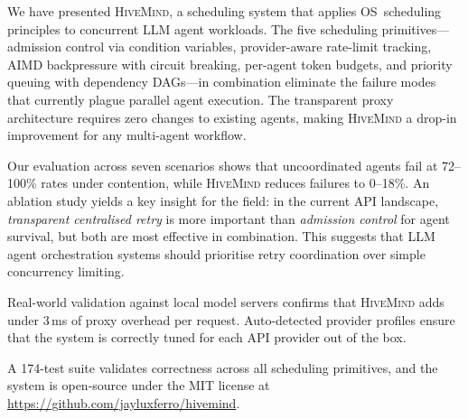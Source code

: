 \documentclass[11pt,twocolumn]{article}
\newcommand{\hm}{\textsc{HiveMind}}
\begin{document}
We have presented \hm{}, a scheduling system that applies
OS~scheduling principles to concurrent LLM agent workloads.
The five scheduling primitives---admission control via condition
variables, provider-aware rate-limit tracking, AIMD backpressure
with circuit breaking, per-agent token budgets, and priority
queuing with dependency DAGs---in combination eliminate the
failure modes that currently plague parallel agent execution.
The transparent proxy architecture requires zero changes to
existing agents, making \hm{} a drop-in improvement for any
multi-agent workflow.

Our evaluation across seven scenarios shows that uncoordinated
agents fail at 72--100\% rates under contention, while \hm{}
reduces failures to 0--18\%.  An ablation study yields a key
insight for the field: in the current API landscape,
\emph{transparent centralised retry} is more important than
\emph{admission control} for agent survival, but both are most
effective in combination.  This suggests that LLM agent
orchestration systems should prioritise retry coordination over
simple concurrency limiting.

Real-world validation against local model servers confirms that
\hm{} adds under 3\,ms of proxy overhead per request.
Auto-detected provider profiles ensure that the system is
correctly tuned for each API provider out of the box.

A 174-test suite validates correctness across all scheduling
primitives, and the system is open-source under the MIT license
at \url{https://github.com/jayluxferro/hivemind}.

\balance
\begingroup
\sloppy


\endgroup
\end{document}
